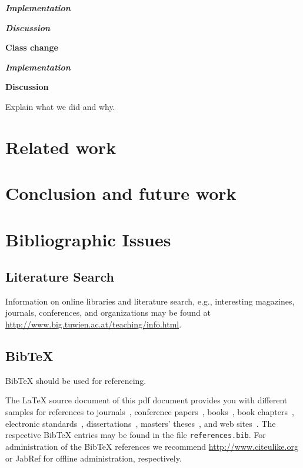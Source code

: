 \documentclass{llncs}
\begin{document}
\textbf\textit{{Implementation}}

\textbf\textit{{Discussion}}

\textbf{Class change}

\textbf\textit{{Implementation}}

\textbf{Discussion}

Explain what we did and why.

\section{Related work}

\section{Conclusion and future work}

\section{Bibliographic Issues}

\subsection{Literature Search}

Information on online libraries and literature search, e.g., interesting magazines, journals, conferences, and organizations may be found at \url{http://www.big.tuwien.ac.at/teaching/info.html}.

\subsection{BibTeX}

BibTeX should be used for referencing.

The LaTeX source document of this pdf document provides you with different samples for references to journals~\cite{jour:B2BServices}, conference papers~\cite{proc:TheWebMLApproach}, books~\cite{book:umlatwork}, book chapters~\cite{incoll:ErhardKonrad1992}, electronic standards~\cite{man:BPEL}, dissertations~\cite{phdthesis:manuelWimmer}, masters' theses~\cite{mast:AUMLProfile}, and web sites~\cite{misc:BIGWebsite}. The respective BibTeX entries may be found in the file \texttt{references.bib}. For administration of the BibTeX references we recommend \url{http://www.citeulike.org} or JabRef for offline administration, respectively.



\end{document}
